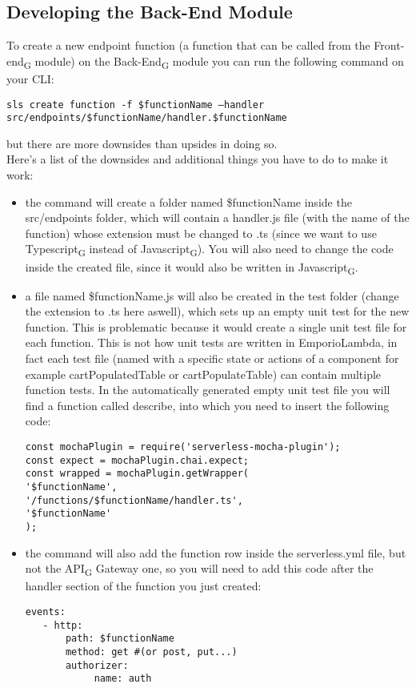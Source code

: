 \subsection{Developing the Back-End Module}
To create a new endpoint function (a function that can be called from the Front-end\textsubscript{G} module) on the Back-End\textsubscript{G} module you can run the following command on your CLI: 
\begin{center}
\texttt{sls create function -f \$functionName --handler src/endpoints/\$functionName/handler.\$functionName}
\end{center}
but there are more downsides than upsides in doing so.\\
Here's a list of the downsides and additional things you have to do to make it work:
\begin{itemize}
\item the command will create a folder named \$functionName inside the src/endpoints folder, which will contain a handler.js file (with the name of the function) whose extension must be changed to .ts (since we want to use Typescript\textsubscript{G} instead of Javascript\textsubscript{G}). You will also need to change the code inside the created file, since it would also be written in Javascript\textsubscript{G}.
\item a file named \$functionName.js will also be created in the test folder (change the extension to .ts here aswell), which sets up an empty unit test for the new function. This is problematic because it would create a single unit test file for each function. This is not how unit tests are written in EmporioLambda, in fact each test file (named with a specific state or actions of a component for example cartPopulatedTable or cartPopulateTable) can contain multiple function tests.
In the automatically generated empty unit test file you will find a function called describe, into which you need to insert the following code:
\begin{lstlisting}
const mochaPlugin = require('serverless-mocha-plugin');
const expect = mochaPlugin.chai.expect;
const wrapped = mochaPlugin.getWrapper(
'$functionName', 
'/functions/$functionName/handler.ts',
'$functionName'
);
\end{lstlisting}
\item the command will also add the function row inside the serverless.yml file, but not the API\textsubscript{G} Gateway one, so you will need to add this code after the handler section of the function you just created:
\begin{lstlisting}
events:
   - http:
       path: $functionName
       method: get #(or post, put...)
       authorizer:
            name: auth
\end{lstlisting}
\end{itemize}
